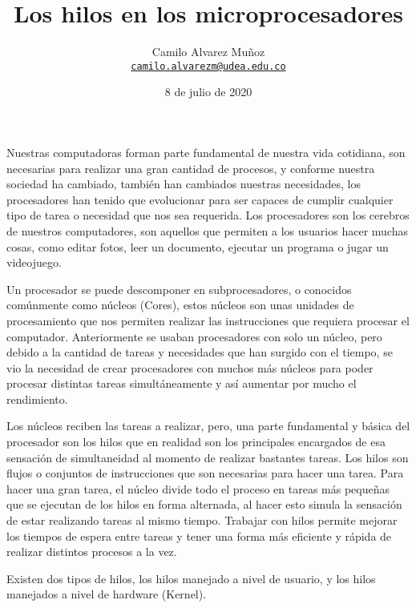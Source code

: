 \documentclass[12pt]{article}
\title{Los hilos en los microprocesadores}
\date{8 de julio de 2020}
\author{Camilo Alvarez Muñoz\\
\href{mailto:camilo.alvarezm@udea.edu.co}{\texttt{camilo.alvarezm@udea.edu.co}}}
\begin{document}
{
\maketitle}
Nuestras computadoras forman parte fundamental de nuestra vida cotidiana, son necesarias para realizar una gran cantidad de procesos, y conforme nuestra sociedad ha cambiado, también han cambiados nuestras necesidades, los procesadores han tenido que evolucionar para ser capaces de cumplir cualquier tipo de  tarea o necesidad que nos sea requerida. Los procesadores son los cerebros de nuestros computadores, son aquellos que permiten a los usuarios hacer muchas cosas, como editar fotos, leer un documento, ejecutar un programa o jugar un videojuego. 

Un procesador se puede descomponer en subprocesadores, o conocidos comúnmente como núcleos (Cores), estos núcleos son unas unidades de procesamiento que nos permiten realizar las instrucciones que requiera procesar el computador. Anteriormente se usaban procesadores con solo un núcleo, pero debido a la cantidad de tareas y necesidades que han surgido con el tiempo, se vio la necesidad de crear procesadores con muchos más núcleos para poder procesar distintas tareas simultáneamente y así aumentar por mucho el rendimiento.

Los núcleos reciben las tareas a realizar, pero, una parte fundamental y básica del procesador son los hilos que en realidad son los principales encargados de esa sensación de simultaneidad al momento de realizar bastantes tareas. Los hilos son flujos o conjuntos de instrucciones que son necesarias para hacer una tarea. Para hacer una gran tarea, el núcleo divide todo el proceso en tareas más pequeñas que se ejecutan de los hilos en forma alternada, al hacer esto simula la sensación de estar realizando tareas al mismo tiempo. Trabajar con hilos permite mejorar los tiempos de espera entre tareas y tener una forma más eficiente y rápida de realizar distintos procesos a la vez.

Existen dos tipos de hilos, los hilos manejado a nivel de usuario, y los hilos manejados a nivel de hardware (Kernel). 

\medskip
 
\end{document}
